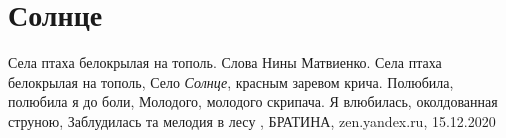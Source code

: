  
 
 
 
 
\chapter{Солнце}

Села птаха белокрылая на тополь. Слова Нины Матвиенко. Села птаха белокрылая на
тополь, Село \emph{Солнце}, красным заревом крича. Полюбила, полюбила я до
боли, Молодого, молодого скрипача. Я влюбилась, околдованная струною,
Заблудилась та мелодия в лесу
, 
БРАТИНА, zen.yandex.ru, 15.12.2020


